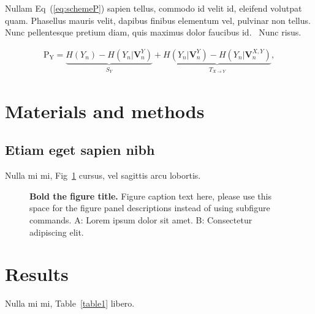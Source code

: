 \documentclass[10pt,letterpaper]{article}
\begin{document}
Nullam Eq~(\ref{eq:schemeP}) sapien tellus, commodo id velit id, eleifend volutpat quam. Phasellus mauris velit, dapibus finibus elementum vel, pulvinar non tellus. Nunc pellentesque pretium diam, quis maximus dolor faucibus id.~\cite{bib2} Nunc risus.

\begin{eqnarray}
\label{eq:schemeP}
	\mathrm{P_Y} = \underbrace{H(Y_n) - H(Y_n|\mathbf{V}^{Y}_{n})}_{S_Y} + \underbrace{H(Y_n|\mathbf{V}^{Y}_{n})- H(Y_n|\mathbf{V}^{X,Y}_{n})}_{T_{X\rightarrow Y}},
\end{eqnarray}

\section*{Materials and methods}
\subsection*{Etiam eget sapien nibh}

Nulla mi mi, Fig~\ref{fig1} cursus,  vel sagittis arcu lobortis.

\begin{figure}[!h]
\caption{{\bf Bold the figure title.}
Figure caption text here, please use this space for the figure panel descriptions instead of using subfigure commands. A: Lorem ipsum dolor sit amet. B: Consectetur adipiscing elit.}
\label{fig1}
\end{figure}

\section*{Results}
Nulla mi mi, Table~\ref{table1} libero.
\end{document}
